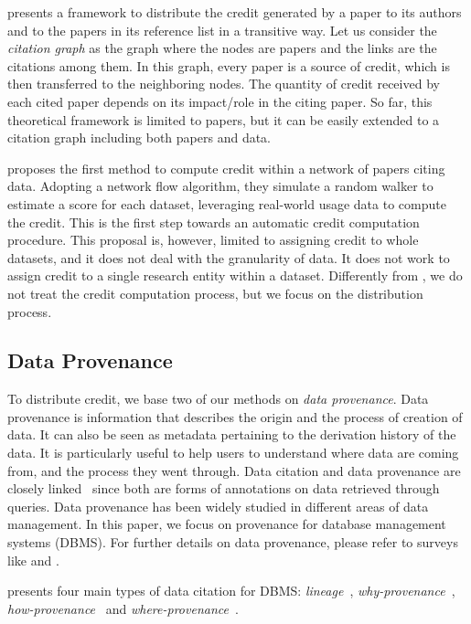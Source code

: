 \documentclass[preprint,12pt,sort&compress]{elsarticle}
\begin{document}
\citet{creditFang18} presents a framework to distribute the credit generated by a paper to its authors and to the papers in its reference list in a transitive way. 
Let us consider the \emph{citation graph} as the graph where the nodes are papers and the links are the citations among them.
In this graph, every paper is a source of credit, which is then transferred to the neighboring nodes.
The quantity of credit received by each cited paper depends on its impact/role in the citing paper. 
So far, this theoretical framework is limited to papers, but it can be easily extended to a citation graph including both papers and data. 

\citet{zeng2020assigning} proposes the first method to compute credit within a network of papers citing data. 
Adopting a network flow algorithm, they simulate a random walker to estimate a score for each dataset, leveraging real-world usage data to compute the credit.
This is the first step towards an automatic credit computation procedure.
This proposal is, however, limited to assigning credit to whole datasets, and it does not deal with the granularity of data. It does not work to assign credit to a single research entity within a dataset. 
Differently from \citet{zeng2020assigning}, we do not treat the credit computation process, but we focus on the distribution process.

\subsection{Data Provenance}
\label{section:related_provenance}

To distribute credit, we base two of our methods on \emph{data provenance}. 
Data provenance is information that describes the origin and the process of creation of data. It can also be seen as metadata pertaining to the derivation history of the data. 
It is particularly useful to help users to understand where data are coming from, and the process they went through. 
Data citation and data provenance are closely linked~\citep{AlawiniDSTW17} since both are forms of annotations on data retrieved through queries. 
Data provenance has been widely studied in different areas of data management. 
In this paper, we focus on provenance for database management systems (DBMS). For further details on data provenance, please refer to surveys like \citep{CheneyProvSurvey} and \citep{SimmhanPG05}.

\citet{CheneyProvSurvey} presents four main types of data citation for DBMS: \emph{lineage}~\citep{lineageCui}, \emph{why-provenance}~\citep{WhyProvBuneman}, \emph{how-provenance}~\citep{howProvenanceGreen} and \emph{where-provenance}~\citep{WhyProvBuneman}.
\end{document}

